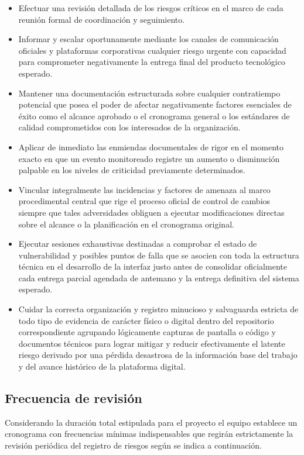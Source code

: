 \documentclass[11pt,spanish]{article}
\begin{document}
\begin{itemize}
    \item Efectuar una revisión detallada de los riesgos críticos en el marco de cada reunión formal de coordinación y seguimiento.
    \item Informar y escalar oportunamente mediante los canales de comunicación oficiales y plataformas corporativas cualquier riesgo urgente con capacidad para comprometer negativamente la entrega final del producto tecnológico esperado.
    \item Mantener una documentación estructurada sobre cualquier contratiempo potencial que posea el poder de afectar negativamente factores esenciales de éxito como el alcance aprobado o el cronograma general o los estándares de calidad comprometidos con los interesados de la organización.
    \item Aplicar de inmediato las enmiendas documentales de rigor en el momento exacto en que un evento monitoreado registre un aumento o disminución palpable en los niveles de criticidad previamente determinados.
    \item Vincular integralmente las incidencias y factores de amenaza al marco procedimental central que rige el proceso oficial de control de cambios siempre que tales adversidades obliguen a ejecutar modificaciones directas sobre el alcance o la planificación en el cronograma original.
    \item Ejecutar sesiones exhaustivas destinadas a comprobar el estado de vulnerabilidad y posibles puntos de falla que se asocien con toda la estructura técnica en el desarrollo de la interfaz justo antes de consolidar oficialmente cada entrega parcial agendada de antemano y la entrega definitiva del sistema esperado.
    \item Cuidar la correcta organización y registro minucioso y salvaguarda estricta de todo tipo de evidencia de carácter físico o digital dentro del repositorio correspondiente agrupando lógicamente capturas de pantalla o código y documentos técnicos para lograr mitigar y reducir efectivamente el latente riesgo derivado por una pérdida desastrosa de la información base del trabajo y del avance histórico de la plataforma digital.
\end{itemize}

\subsection{Frecuencia de revisión}

Considerando la duración total estipulada para el proyecto el equipo establece un cronograma con frecuencias mínimas indispensables que regirán estrictamente la revisión periódica del registro de riesgos según se indica a continuación.
\end{document}
